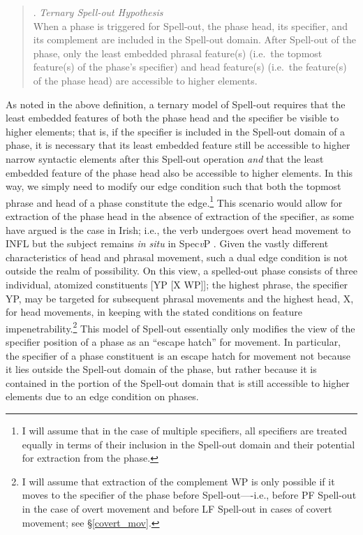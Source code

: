 \singlespacing
\begin{quote}
\ex. {\it Ternary Spell-out Hypothesis}\\
When a phase is triggered for Spell-out, the phase head, its specifier, and its complement are included in the Spell-out domain. After Spell-out of the phase, only the least embedded phrasal feature(s) (i.e.\ the topmost feature(s) of the phase's specifier) and head feature(s) (i.e.\ the feature(s) of the phase head) are accessible to higher elements.

\end{quote}
\onehalfspacing
As noted in the above definition, a ternary model of Spell-out requires that the least embedded features of both the phase head and the specifier be visible to higher elements; that is, if the specifier is included in the Spell-out domain of a phase, it is necessary that its least embedded feature still be accessible to higher narrow syntactic elements after this Spell-out operation {\it and} that the least embedded feature of the phase head also be accessible to higher elements. In this way, we simply need to modify our edge condition such that both the topmost phrase and head of a phase constitute the edge.\footnote{I will assume that in the case of multiple specifiers, all specifiers are treated equally in terms of their inclusion in the Spell-out domain and their potential for extraction from the phase.} This scenario would allow for extraction of the phase head in the absence of extraction of the specifier, as some have argued is the case in Irish; i.e., the verb undergoes overt head movement to INFL but the subject remains {\it in situ} in Spec{\it v}P \citep{mccloskey1991}. Given the vastly different characteristics of head and phrasal movement, such a dual edge condition is not outside the realm of possibility. On this view, a spelled-out phase consists of three individual, atomized constituents [YP [X WP]]; the highest phrase, the specifier YP, may be targeted for subsequent phrasal movements and the highest head, X, for head movements, in keeping with the stated conditions on feature impenetrability.\footnote{I will assume that extraction of the complement WP is only possible if it moves to the specifier of the phase before Spell-out----i.e., before PF Spell-out in the case of overt movement and before LF Spell-out in cases of covert movement; see \S\ref{covert_mov}.} This model of Spell-out essentially only modifies the view of the specifier position of a phase as an ``escape hatch'' for movement. In particular, the specifier of a phase constituent is an escape hatch for movement not because it lies outside the Spell-out domain of the phase, but rather because it is contained in the portion of the Spell-out domain that is still accessible to higher elements due to an edge condition on phases.

